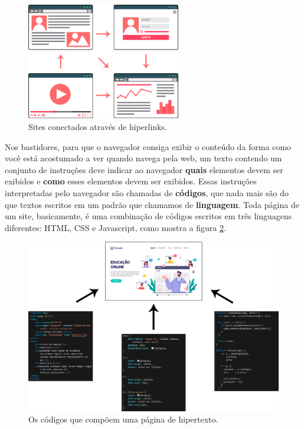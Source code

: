\begin{figure}[htbp!]
    \centering
    \includegraphics[width=0.6\textwidth]{Images/chapter01/sites_linkados.png}
    \caption{Sites conectados através de hiperlinks.}
    \label{fig:siteslinked}
\end{figure}

Nos bastidores, para que o navegador consiga exibir o conteúdo da forma como você está acostumado a ver quando navega pela web, um texto contendo um conjunto de instruções deve indicar ao navegador \textbf{quais} elementos devem ser exibidos e \textbf{como} esses elementos devem ser exibidos. Essas instruções interpretadas pelo navegador são chamadas de \textbf{códigos}, que nada mais são do que textos escritos em um padrão que chamamos de \textbf{linguagem}. Toda página de um site, basicamente, é uma combinação de códigos escritos em três linguagens diferentes: HTML, CSS e Javascript, como mostra a figura \ref{fig:sitescodigo}.

\begin{figure}[htbp!]
    \centering
    \includegraphics[width=1\textwidth]{Images/chapter01/site_codigos.png}
    \caption{Os códigos que compõem uma página de hipertexto.}
    \label{fig:sitescodigo}
\end{figure}

